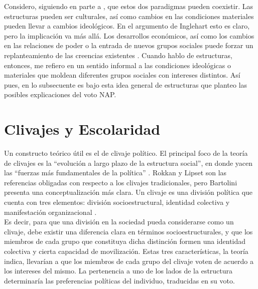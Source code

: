 Considero, siguiendo en parte a \textcite{Sewell92}, que estos dos paradigmas pueden coexistir. Las estructuras pueden ser culturales, así como cambios en las condiciones materiales pueden llevar a cambios ideológicos. En el argumento de Inglehart esto es claro, pero la implicación va más allá. Los desarrollos económicos, así como los cambios en las relaciones de poder o la entrada de nuevos grupos sociales puede forzar un replanteamiento de las creencias existentes \parencite{Berman01}. Cuando hablo de estructuras, entonces, me refiero en un sentido informal a las condiciones ideológicas o materiales que moldean diferentes grupos sociales con intereses distintos. Así pues, en lo subsecuente es bajo esta idea general de estructuras que planteo las posibles explicaciones del voto NAP.\\ 

\section{Clivajes y Escolaridad}

Un constructo teórico útil es el de clivaje político. El principal foco de la teoría de clivajes es la ``evolución a largo plazo de la estructura social'', en donde yacen las ``fuerzas más fundamentales de la política'' \parencite{Bornschier09}. Rokkan y Lipset son las referencias obligadas con respecto a los clivajes tradicionales, pero Bartolini presenta una conceptualización más clara. Un clivaje es una división política que cuenta con tres elementos: división socioestructural, identidad colectiva y manifestación organizacional \parencite{Bornschier09}.\\

Es decir, para que una división en la sociedad pueda considerarse como un clivaje, debe existir una diferencia clara en términos socioestructurales, y que los miembros de cada grupo que constituya dicha distinción formen una identidad colectiva y cierta capacidad de movilización. Estas tres características, la teoría indica, llevarían a que los miembros de cada grupo del clivaje voten de acuerdo a los intereses del mismo. La pertenencia a uno de los lados de la estructura determinaría las preferencias políticas del individuo, traducidas en su voto.\\

